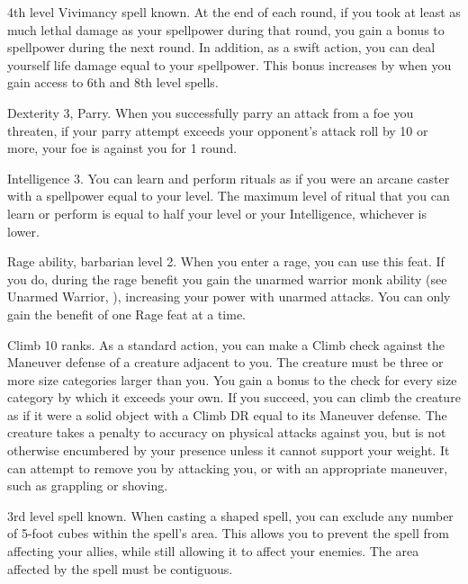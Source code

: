 \featpre 4th level Vivimancy spell known.
\featben At the end of each round, if you took at least as much lethal damage as your spellpower during that round, you gain a  bonus to spellpower during the next round.
In addition, as a swift action, you can deal yourself life damage equal to your spellpower.
This bonus increases by  when you gain access to 6th and 8th level spells.

\featpres Dexterity 3, Parry.
\featben When you successfully parry an attack from a foe you threaten, if your parry attempt exceeds your opponent's attack roll by 10 or more, your foe is  against you for 1 round.

\featpre Intelligence 3.
\featben You can learn and perform rituals as if you were an arcane caster with a spellpower equal to your level.
The maximum level of ritual that you can learn or perform is equal to half your level or your Intelligence, whichever is lower.

\featpre Rage ability, barbarian level 2.
\featben When you enter a rage, you can use this feat. If you do, during the rage benefit you gain the unarmed warrior monk ability (see Unarmed Warrior, ), increasing your power with unarmed attacks.
 You can only gain the benefit of one Rage feat at a time.

\featpre Climb 10 ranks.
\featben As a standard action, you can make a Climb check against the Maneuver defense of a creature adjacent to you.
The creature must be three or more size categories larger than you.
You gain a  bonus to the check for every size category by which it exceeds your own.
If you succeed, you can climb the creature as if it were a solid object with a Climb DR equal to its Maneuver defense.
The creature takes a  penalty to accuracy on physical attacks against you, but is not otherwise encumbered by your presence unless it cannot support your weight.
It can attempt to remove you by attacking you, or with an appropriate maneuver, such as grappling or shoving.

\featpre 3rd level spell known.
\featben When casting a shaped spell, you can exclude any number of 5-foot cubes within the spell's area.
This allows you to prevent the spell from affecting your allies, while still allowing it to affect your enemies.
The area affected by the spell must be contiguous.

